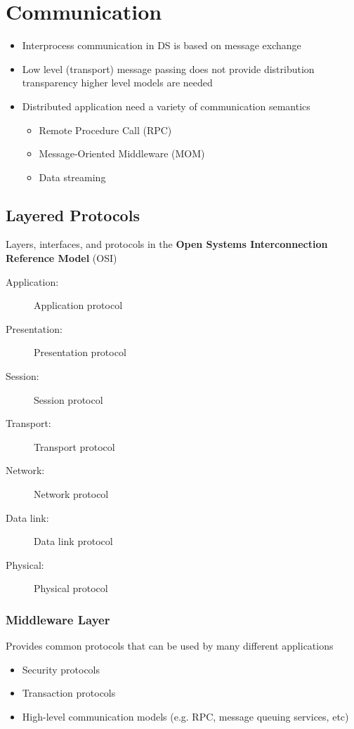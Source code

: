 \section{Communication}
\begin{itemize}
	\item Interprocess communication in DS is based on message exchange
	\item Low level (transport) message passing does not provide distribution transparency
	\subitem higher level models are needed
	\item Distributed application need a variety of communication semantics
	\begin{itemize}
		\item Remote Procedure Call (RPC)
		\item Message-Oriented Middleware (MOM)
		\item Data streaming
	\end{itemize}	
\end{itemize}

\subsection{Layered Protocols}
Layers, interfaces, and protocols in the \textbf{Open Systems Interconnection Reference Model} (OSI)
\begin{description}
	\item[Application:] Application protocol
	\item[Presentation:] Presentation protocol
	\item[Session:] Session protocol
	\item[Transport:] Transport protocol
	\item[Network:] Network protocol
	\item[Data link:] Data link protocol
	\item[Physical:] Physical protocol
\end{description}

\subsubsection{Middleware Layer}
Provides common protocols that can be used by many different applications
\begin{itemize}
	\item Security protocols
	\item Transaction protocols
	\item High-level communication models (e.g. RPC, message queuing services, etc)	
\end{itemize}


